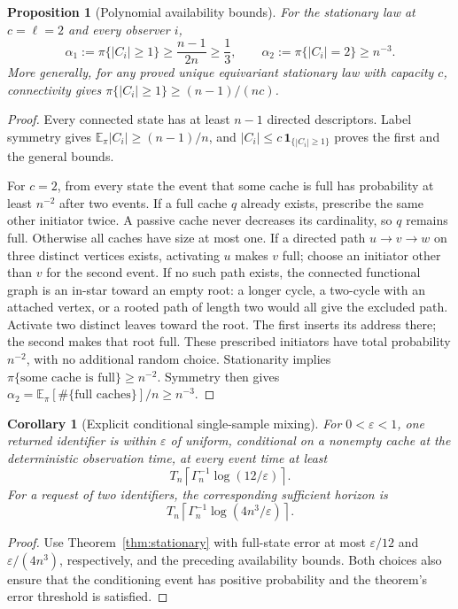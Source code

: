 \documentclass[11pt]{article}
\newtheorem{proposition}[theorem]{Proposition}
\newtheorem{corollary}[theorem]{Corollary}
\begin{document}
\begin{proposition}[Polynomial availability bounds]
\label{prop:c2availabilityquant}
For the stationary law at $c=\ell=2$ and every observer $i$,
\[
 \alpha_1:=\pi\{|C_i|\ge1\}
 \ge\frac{n-1}{2n}\ge\frac13,\qquad
 \alpha_2:=\pi\{|C_i|=2\}\ge n^{-3}.
\]
More generally, for any proved unique equivariant stationary
law with capacity $c$, connectivity gives
$\pi\{|C_i|\ge1\}\ge(n-1)/(nc)$.
\end{proposition}
\begin{proof}
Every connected state has at least $n-1$ directed descriptors.
Label symmetry gives $\mathbb E_\pi|C_i|\ge(n-1)/n$,
and $|C_i|\le c\,\mathbf1_{\{|C_i|\ge1\}}$ proves
the first and the general bounds.

For $c=2$, from every state the event that some cache is
full has probability at least $n^{-2}$ after two events.
If a full cache $q$ already exists, prescribe the same
other initiator twice. A passive cache never decreases
its cardinality, so $q$ remains full.
Otherwise all caches have size at most one.
If a directed path $u\to v\to w$ on three distinct
vertices exists, activating $u$ makes $v$ full; choose
an initiator other than $v$ for the second event.
If no such path exists, the connected functional graph
is an in-star toward an empty root: a longer cycle,
a two-cycle with an attached vertex, or a rooted path
of length two would all give the excluded path.
Activate two distinct leaves toward the root.
The first inserts its address there; the second makes
that root full. These prescribed initiators have total
probability $n^{-2}$, with no additional random choice.
Stationarity implies $\pi\{\text{some cache is full}\}\ge n^{-2}$.
Symmetry then gives
$\alpha_2=\mathbb E_\pi[\#\{\text{full caches}\}]/n\ge n^{-3}$.
\end{proof}

\begin{corollary}[Explicit conditional single-sample mixing]
\label{cor:c2samplemixquant}
For $0<\varepsilon<1$, one returned identifier is within
$\varepsilon$ of uniform, conditional on a nonempty cache
at the deterministic observation time, at every event time
at least
\[
 T_n\left\lceil\Gamma_n^{-1}\log(12/\varepsilon)\right\rceil.
\]
For a request of two identifiers, the corresponding
sufficient horizon is
\[
 T_n\left\lceil\Gamma_n^{-1}\log(4n^3/\varepsilon)\right\rceil.
\]
\end{corollary}
\begin{proof}
Use Theorem~\ref{thm:stationary} with full-state error
at most $\varepsilon/12$ and $\varepsilon/(4n^3)$,
respectively, and the preceding availability bounds.
Both choices also ensure that the conditioning event
has positive probability and the theorem's error
threshold is satisfied.
\end{proof}
\end{document}
